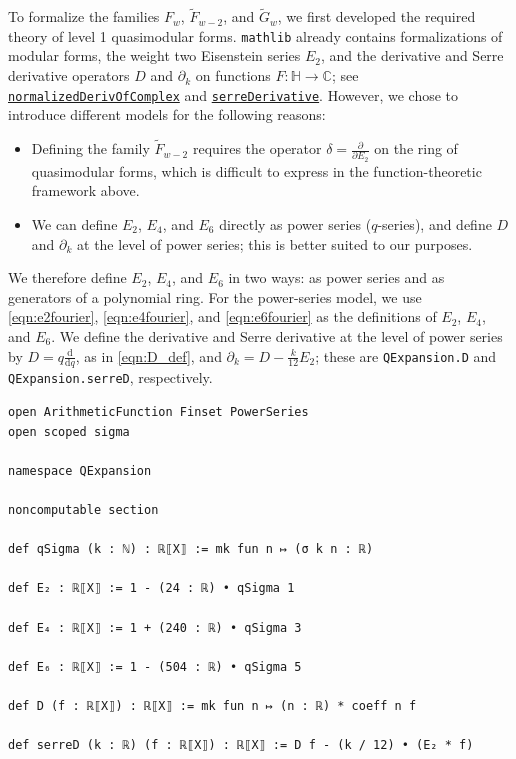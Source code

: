 \documentclass[10pt,reqno]{amsproc}
\newcommand{\wtilde}{\widetilde}
\newcommand{\dd}{\mathrm{d}}
\newcommand{\bC}{\mathbb{C}}
\newcommand{\bH}{\mathbb{H}}
\newcommand{\1}{\mathds{1}}	%
\theoremstyle{definition}
\theoremstyle{remark}
\begin{document}
To formalize the families $F_w$, $\wtilde{F}_{w-2}$, and $\wtilde{G}_w$, we first developed the required theory of level 1 quasimodular forms.
\texttt{mathlib} already contains formalizations of modular forms, the weight two Eisenstein series $E_2$, and the derivative and Serre derivative operators $D$ and $\partial_k$ on functions $F : \bH \to \bC$; see \href{https://leanprover-community.github.io/mathlib4_docs/Mathlib/NumberTheory/ModularForms/Derivative.html#Derivative.normalizedDerivOfComplex}{\lstinline|normalizedDerivOfComplex|} and \href{https://leanprover-community.github.io/mathlib4_docs/Mathlib/NumberTheory/ModularForms/Derivative.html#Derivative.serreDerivative}{\lstinline|serreDerivative|}.
However, we chose to introduce different models for the following reasons:
\begin{itemize}
  \item Defining the family $\wtilde{F}_{w-2}$ requires the operator $\delta = \frac{\partial}{\partial E_2}$ on the ring of quasimodular forms, which is difficult to express in the function-theoretic framework above.
  \item We can define $E_2$, $E_4$, and $E_6$ directly as power series ($q$-series), and define $D$ and $\partial_k$ at the level of power series; this is better suited to our purposes.
\end{itemize}
We therefore define $E_2$, $E_4$, and $E_6$ in two ways: as power series and as generators of a polynomial ring.
For the power-series model, we use \eqref{eqn:e2fourier}, \eqref{eqn:e4fourier}, and \eqref{eqn:e6fourier} as the definitions of $E_2$, $E_4$, and $E_6$.
We define the derivative and Serre derivative at the level of power series by $D = q \frac{\dd}{\dd q}$, as in \eqref{eqn:D_def}, and $\partial_k = D - \frac{k}{12} E_2$; these are \lstinline|QExpansion.D| and \lstinline|QExpansion.serreD|, respectively.

\begin{lstlisting}[language=lean]
open ArithmeticFunction Finset PowerSeries
open scoped sigma

namespace QExpansion

noncomputable section

def qSigma (k : ℕ) : ℝ⟦X⟧ := mk fun n ↦ (σ k n : ℝ)

def E₂ : ℝ⟦X⟧ := 1 - (24 : ℝ) • qSigma 1

def E₄ : ℝ⟦X⟧ := 1 + (240 : ℝ) • qSigma 3

def E₆ : ℝ⟦X⟧ := 1 - (504 : ℝ) • qSigma 5

def D (f : ℝ⟦X⟧) : ℝ⟦X⟧ := mk fun n ↦ (n : ℝ) * coeff n f

def serreD (k : ℝ) (f : ℝ⟦X⟧) : ℝ⟦X⟧ := D f - (k / 12) • (E₂ * f)
\end{lstlisting}
\end{document}
